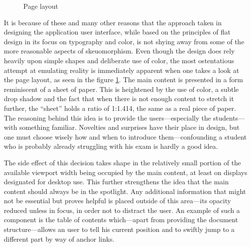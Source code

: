 \documentclass[thesis=M,english,hidelinks]{FITthesis}[2012/10/20]
\begin{document}
\begin{figure}
  \setlength\fboxsep{0pt}
  \setlength\fboxrule{0.2pt}
  \caption{Page layout}
  \label{fig:page_layout}
\end{figure}

It is because of these and many other reasons that the approach taken in designing the application user interface, while based on the principles of flat design in its focus on typography and color, is not shying away from some of the more reasonable aspects of skeuomorphism. Even though the design does rely heavily upon simple shapes and deliberate use of color, the most ostentatious attempt at emulating reality is immediately apparent when one takes a look at the page layout, as seen in the figure \ref{fig:page_layout}. The main content is presented in a form reminiscent of a sheet of paper. This is heightened by the use of color, a subtle drop shadow and the fact that when there is not enough content to stretch it further, the ``sheet'' holds a ratio of 1:1.414, the same as a real piece of paper. The reasoning behind this idea is to provide the users---especially the students---with something familiar. Novelties and surprises have their place in design, but one must choose wisely how and when to introduce them---confounding a student who is probably already struggling with his exam is hardly a good idea.

The side effect of this decision takes shape in the relatively small portion of the available viewport width being occupied by the main content, at least on displays designated for desktop use. This further strengthens the idea that the main content should always be in the spotlight. Any additional information that might not be essential but proves helpful is placed outside of this area---its opacity reduced unless in focus, in order not to distract the user. An example of such a component is the table of contents which---apart from providing the document structure---allows an user to tell his current position and to swiftly jump to a different part by way of anchor links.
\end{document}
